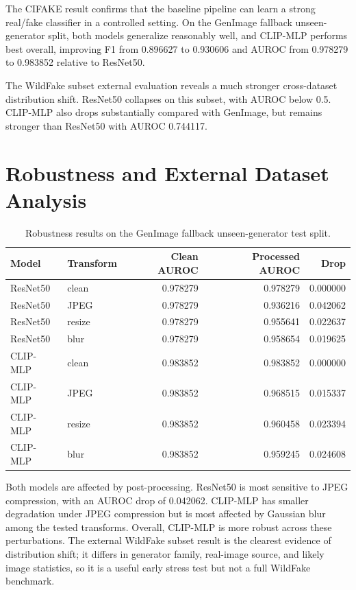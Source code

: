 \documentclass[11pt]{article}
\begin{document}
The CIFAKE result confirms that the baseline pipeline can learn a strong real/fake classifier in a controlled setting. On the GenImage fallback unseen-generator split, both models generalize reasonably well, and CLIP-MLP performs best overall, improving F1 from 0.896627 to 0.930606 and AUROC from 0.978279 to 0.983852 relative to ResNet50.

The WildFake subset external evaluation reveals a much stronger cross-dataset distribution shift. ResNet50 collapses on this subset, with AUROC below 0.5. CLIP-MLP also drops substantially compared with GenImage, but remains stronger than ResNet50 with AUROC 0.744117.

\section{Robustness and External Dataset Analysis}

\begin{table}[h]
\centering
\caption{Robustness results on the GenImage fallback unseen-generator test split.}
\small
\begin{tabular}{llrrr}
\toprule
Model & Transform & Clean AUROC & Processed AUROC & Drop \\
\midrule
ResNet50 & clean & 0.978279 & 0.978279 & 0.000000 \\
ResNet50 & JPEG & 0.978279 & 0.936216 & 0.042062 \\
ResNet50 & resize & 0.978279 & 0.955641 & 0.022637 \\
ResNet50 & blur & 0.978279 & 0.958654 & 0.019625 \\
CLIP-MLP & clean & 0.983852 & 0.983852 & 0.000000 \\
CLIP-MLP & JPEG & 0.983852 & 0.968515 & 0.015337 \\
CLIP-MLP & resize & 0.983852 & 0.960458 & 0.023394 \\
CLIP-MLP & blur & 0.983852 & 0.959245 & 0.024608 \\
\bottomrule
\end{tabular}
\end{table}

Both models are affected by post-processing. ResNet50 is most sensitive to JPEG compression, with an AUROC drop of 0.042062. CLIP-MLP has smaller degradation under JPEG compression but is most affected by Gaussian blur among the tested transforms. Overall, CLIP-MLP is more robust across these perturbations. The external WildFake subset result is the clearest evidence of distribution shift; it differs in generator family, real-image source, and likely image statistics, so it is a useful early stress test but not a full WildFake benchmark.
\end{document}
